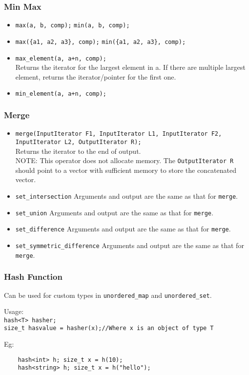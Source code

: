 \subsubsection{Min Max}
\begin{itemize}
\item \texttt{max(a, b, comp);} \texttt{min(a, b, comp);}
\item \texttt{max(\{a1, a2, a3\}, comp);} \texttt{min(\{a1, a2, a3\}, comp);}
\item \texttt{max\_element(a, a+n, comp);}\\
Returns the iterator for the largest element in a. If there are multiple largest element, returns the iterator/pointer for the first one.
\item \texttt{min\_element(a, a+n, comp);}\\
\end{itemize}

\subsubsection{Merge}
\begin{itemize}
\item \texttt{merge(InputIterator F1, InputIterator L1, InputIterator F2, InputIterator L2, OutputIterator R);} \\
Returns the iterator to the end of output.\\
NOTE: This operator does not allocate memory. The \texttt{OutputIterator R} should point to a vector with sufficient memory to store the concatenated vector.\\
\item \texttt{set\_intersection} Arguments and output are the same as that for \texttt{merge}.
\item \texttt{set\_union} Arguments and output are the same as that for \texttt{merge}.
\item \texttt{set\_difference} Arguments and output are the same as that for \texttt{merge}.
\item \texttt{set\_symmetric\_difference} Arguments and output are the same as that for \texttt{merge}.
\end{itemize}

\subsubsection{Hash Function}
Can be used for custom types in \texttt{unordered\_map} and \texttt{unordered\_set}.
\begin{mdframed}[backgroundcolor=gray!10,linecolor=Firebrick4]
Usage:\\
\texttt{hash<T> hasher;}\\
\texttt{size\_t hasvalue = hasher(x);//Where x is an object of type T}\\
\end{mdframed}
Eg:
\begin{verbatim}
    hash<int> h; size_t x = h(10);
    hash<string> h; size_t x = h("hello");
\end{verbatim}

